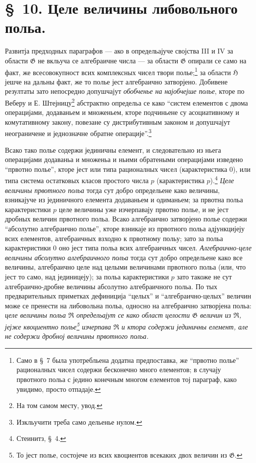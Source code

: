 ﻿\documentclass[11pt]{article}
\begin{document}
\section*{\S\ 10. Целе величины либовольного польа.}

Развитја предходных параграфов --- ако в определьајуче својства III и IV за
области $\mathfrak G$ не вкльуча се алгебраичне числа --- за области
$\mathfrak G$ опирали се само на факт, же всесовокупност всих комплексных чисел
твори полье;\footnote{Само в \S\ 7 была употребльена додатна предпоставка, же
``првотно полье'' рационалных чисел содержи бесконечно много елементов; в
случају првотного польа с једино конечным многом елементов тој параграф, како
увидимо, просто отпадаје.} за области $\mathfrak H$ јешче на дальны факт, же
то полье јест алгебраично затворјено. Добивене резултаты зато непосредно
допушчајут {\itshape обобченье на најобчејше полье}, кторе по Веберу и
Е. Штејницу\footnote{На том самом месту, увод.} абстрактно определьа се како
``систем елементов с двома операцијами, додаваньем и множеньем, кторе подчиньене
су асоциативному и комутативному закону, повезане су дистрибутивным законом и
допушчајут неограничене и једнозначне обратне операције''.\footnote{Изкльучити
треба само дельенье нулом.}

Всако тако полье содержи јединичны елемент, и следовательно из ньега операцијами
додаваньа и множеньа и ньими обратеными операцијами изведено ``првотно полье'',
кторе јест или типа рационалных чисел (карактеристика $0$), или типа система
остатковых класов простого числа $p$ (карактеристика $p$).\footnote{Стеинитз,
\S\ 4.} {\itshape Целе величины првотного польа} тогда сут добро определьене
како величины, взникајуче из јединичного елемента додаваньем и одиманьем; за
првотна польа карактеристики $p$ целе величины уже изчерпавају првотно полье, и
не јест дробных величин првотного польа. Всако алгебраично затворјено полье
содержи ``абсолутно алгебраично полье'', кторе взникаје из првотного польа
адјункцијеју всих елементов, алгебраичных взходно к првотному польу; зато за
польа карактеристики $0$ оно јест типа польа всих алгебраичных чисел.
{\itshape Алгебраично-целе величины абсолутно алгебраичного польа} тогда сут
добро определьене како все величины, алгебраично целе над целыми величинами
првотного польа (или, что јест то само, над јединицеју); за польа
карактеристики $p$ зато такоже не сут алгебраично-дробне величины абсолутно
алгебраичного польа. По тых предварительных приметках дефиниција ``целых'' и
``алгебраично-целых'' величин може се пренести на либовольна польа, односно на
алгебраично затворјена польа: {\itshape целе величины польа $\mathfrak R$
определьајут се како област целости $\mathfrak G$ величин из $\mathfrak R$,
јејже квоциентно полье\footnote{То јест полье, состојече из всих квоциентов
всекаких двох величин из $\mathfrak G$.} изчерпава $\mathfrak R$ и ктора содержи
јединичны елемент, але не содержи дробној величины првотного польа.}
\end{document}
